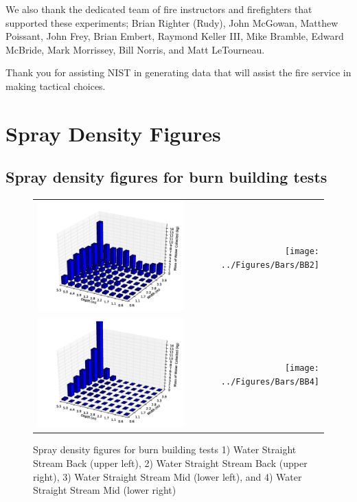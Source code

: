 \documentclass[12pt,oneside]{book}
\begin{document}
We also thank the dedicated team of fire instructors and firefighters that supported these experiments; Brian Righter (Rudy), John McGowan, Matthew Poissant, John Frey, Brian Embert, Raymond Keller III, Mike Bramble, Edward McBride, Mark Morrissey, Bill Norris, and Matt LeTourneau.

Thank you for assisting NIST in generating data that will assist the fire service in making tactical choices.



\appendix


\chapter{Spray Density Figures}
\label{app:spray_density}

\section{Spray density figures for burn building tests}
\label{app:spray_bb}

\begin{figure}[ht]
\begin{tabular*}{\textwidth}{lr}
\includegraphics[width=3.2in]{../Figures/Bars/BB1} &
\texttt{[image: ../Figures/Bars/BB2]} \\
\includegraphics[width=3.2in]{../Figures/Bars/BB3} &
\texttt{[image: ../Figures/Bars/BB4]}
\end{tabular*}
\caption{Spray density figures for burn building tests 1) Water Straight Stream Back (upper left), 2) Water Straight Stream Back (upper right), 3) Water Straight Stream Mid (lower left), and 4) Water Straight Stream Mid (lower right)}
\label{fig:bb_1_4}
\end{figure}
\end{document}
